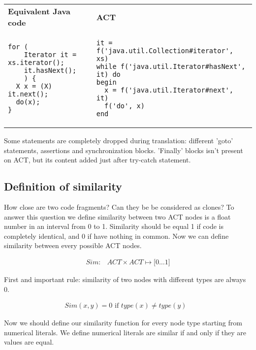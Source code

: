 \begin{tabular}{ p{6cm} p{6cm} }
\textbf{Equivalent Java code} & \textbf{ACT} \\
\begin{verbatim}
for (
    Iterator it = xs.iterator();
    it.hasNext();
    ) {
  X x = (X) it.next();
  do(x);    
}
\end{verbatim} 
  & 
\begin{verbatim}
it = f('java.util.Collection#iterator', xs)
while f('java.util.Iterator#hasNext', it) do 
begin
  x = f('java.util.Iterator#next', it)
  f('do', x)
end
\end{verbatim}
\end{tabular}

Some statements are completely dropped during translation: different 'goto' statements, assertions and synchronization
blocks. 'Finally' blocks isn't  present on ACT, but its content added just after try-catch statement.

\subsection{Definition of similarity}

How close are two code fragments?
Can they be be considered as clones?
To answer this question we define similarity between two ACT nodes is a float number in an interval from 0 to 1.
Similarity should be equal 1 if code is completely identical, and 0 if have nothing in common.
Now we can define similarity between every possible ACT nodes.

\begin{mydef}
\begin{align*}
  Sim \colon & ACT \times ACT \mapsto \lbrack 0 \ldots 1 \rbrack
\end{align*}
\end{mydef}

First and important rule: similarity of two nodes with different types are always 0.

\begin{mydef}
\begin{align*}
  Sim(x, y) = 0 \text{ if $type(x) \neq type(y)$ }
\end{align*}
\end{mydef}

Now we should define our similarity function for every node type starting from numerical literals. We define numerical literals are similar if and only if they are values are equal.

